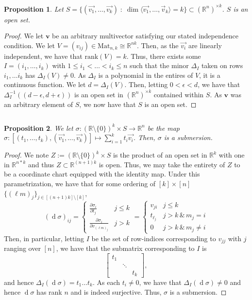 \documentclass[english]{article}
\let\avec=\vec
\renewcommand\vec{\mathbf}
\renewcommand{\d}[1]{\ensuremath{\operatorname{d}\!{#1}}}
\newcommand{\pydx}[2]{\frac{\partial #1}{\partial #2}}
\newcommand{\RR}{\mathbb{R}}
\newcommand{\prt}[1]{\setcounter{subsection}{#1-1}\subsection{}}
\newtheorem*{proposition*}{Proposition}
\theoremstyle{remark}
\theoremstyle{definition}
\newcommand{\idl}[1]{\langle #1\rangle}
\begin{document}
\begin{proposition*}
	Let $S=\{(\avec{v_1},\dots,\avec{v_k})\;:\;\dim\idl{\avec{v_1},\dots,\avec{v}_k}=k\}\subset (\RR^n)^{\times k}$. $S$ is an open set. 
\end{proposition*}\begin{proof}
We let $\vec{v}$ be an arbitrary multivector satisfying our stated independence condition. We let $V=(v_{ij})\in \mathrm{Mat}_{n,k}\cong \RR^{nk}$. Then, as the $\avec{v_i}$ are linearly independent, we have that $\mathrm{rank}(V)=k$. Thus, there exists some $I=(i_1,\dots,i_k)$ with $1\leq i_1<\dots<i_k\leq n$ such that the minor $\Delta_I$ taken on rows $i_1,\dots i_k$ has $\Delta_I(V)\neq 0$. As $\Delta_I$ is a polynomial in the entires of $V$, it is a continuous function. We let $d=\Delta_I(V)$. Then, letting $0<\epsilon<d$, we have that $\Delta_I^{-1}((d-\epsilon,d+\epsilon))$ is an open set in $(\RR^{n})^{\times k}$ contained within $S$. As $\vec{v}$ was an arbitrary element of $S$, we now have that $S$ is an open set.\end{proof}
\prt{2} \begin{proposition*}
	We let $\sigma: (\RR\setminus \{0\})^k \times S\to \RR^n$ be the map $\sigma:[(t_1,\dots,t_k),(\avec{v_1},\dots,\avec{v_k})]\mapsto \sum_{i=1}^kt_i\avec{v_i}$. Then, $\sigma$ is a submersion.
\end{proposition*}
\begin{proof}
	We note $Z:=(\RR\setminus \{0\})^k \times S$ is the product of an open set in $\RR^k$ with one in $\RR^{n*k}$ and thus $Z\subset \RR^{(n+1)k}$ is open. Thus, we may take the entirety of $Z$ to be a coordinate chart equipped with the identity map. Under this parametrization, we have that for some ordering of $[k]\times [n]$ $\{(\ell m)_j\}_{j\in[(n+1)k]\setminus[k]}$, \begin{equation*}(\d \sigma)_{ij}=\begin{cases}\pydx{\sigma_i}{t_j}&j\leq k\\
	\pydx{\sigma_i}{v_{(\ell m)_j}}&j>k\end{cases}=\begin{cases}v_{ji
	}&j\leq k\\
	t_{\ell_j}&j>k\,\&\,m_j=i\\0&j>k\,\&\,m_j\neq i\end{cases}\end{equation*} 
	Then, in particular, letting $I$ be the set of row-indices corresponding to $v_{jj}$ with $j$ ranging over $[n]$, we have that the submatrix corresponding to $I$ is $$\begin{bmatrix}t_1&&\\
	&\ddots&\\
	&&t_k\end{bmatrix},$$  and hence $\Delta_I(\d \sigma)=t_1\dots t_k$. As each $t_i\neq 0$, we have that $\Delta_I(\d\sigma)\neq0$ and hence $\d \sigma$ has rank $n$ and is indeed surjective. Thus, $\sigma$ is a submersion.
%
\end{proof}
\end{document}
